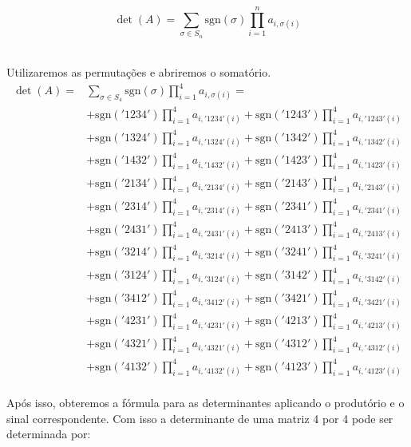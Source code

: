 \documentclass[12pt, a4paper]{article}
\begin{document}
\vspace{20pt}
$$
\det(A) = \sum_{\sigma \in S_n} \mathrm{sgn}(\sigma) \prod_{i=1}^n a_{i,\sigma(i)}
$$
\\
\vspace{20pt}
\par Utilizaremos as permutações e abriremos o somatório.
\begin{equation*}
\begin{aligned}
\det(A) = & \sum_{\sigma \in S_4} \mathrm{sgn}(\sigma) \prod_{i=1}^4 a_{i,\sigma(i)} = \\
& + \mathrm{sgn}('1234') \prod_{i=1}^4 a_{i,'1234'(i)}
 + \mathrm{sgn}('1243') \prod_{i=1}^4 a_{i,'1243'(i)} \\
& + \mathrm{sgn}('1324') \prod_{i=1}^4 a_{i,'1324'(i)}
+ \mathrm{sgn}('1342') \prod_{i=1}^4 a_{i,'1342'(i)} \\
& + \mathrm{sgn}('1432') \prod_{i=1}^4 a_{i,'1432'(i)}
+ \mathrm{sgn}('1423') \prod_{i=1}^4 a_{i,'1423'(i)}\\
& + \mathrm{sgn}('2134') \prod_{i=1}^4 a_{i,'2134'(i)}
+ \mathrm{sgn}('2143') \prod_{i=1}^4 a_{i,'2143'(i)}\\
& + \mathrm{sgn}('2314') \prod_{i=1}^4 a_{i,'2314'(i)}
+ \mathrm{sgn}('2341') \prod_{i=1}^4 a_{i,'2341'(i)}\\
& + \mathrm{sgn}('2431') \prod_{i=1}^4 a_{i,'2431'(i)}
+ \mathrm{sgn}('2413') \prod_{i=1}^4 a_{i,'2413'(i)}\\
& + \mathrm{sgn}('3214') \prod_{i=1}^4 a_{i,'3214'(i)}
+ \mathrm{sgn}('3241') \prod_{i=1}^4 a_{i,'3241'(i)}\\
& + \mathrm{sgn}('3124') \prod_{i=1}^4 a_{i,'3124'(i)}
+ \mathrm{sgn}('3142') \prod_{i=1}^4 a_{i,'3142'(i)}\\
& + \mathrm{sgn}('3412') \prod_{i=1}^4 a_{i,'3412'(i)} 
+ \mathrm{sgn}('3421') \prod_{i=1}^4 a_{i,'3421'(i)}\\
& + \mathrm{sgn}('4231') \prod_{i=1}^4 a_{i,'4231'(i)}
+ \mathrm{sgn}('4213') \prod_{i=1}^4 a_{i,'4213'(i)}\\
& + \mathrm{sgn}('4321') \prod_{i=1}^4 a_{i,'4321'(i)}
+ \mathrm{sgn}('4312') \prod_{i=1}^4 a_{i,'4312'(i)}\\
& + \mathrm{sgn}('4132') \prod_{i=1}^4 a_{i,'4132'(i)}
+ \mathrm{sgn}('4123') \prod_{i=1}^4 a_{i,'4123'(i)}\\
\end{aligned}
\end{equation*}

\par Após isso, obteremos a fórmula para as determinantes aplicando o produtório e o sinal correspondente. Com isso a determinante de uma matriz 4 por 4 pode ser determinada por:
\end{document}
